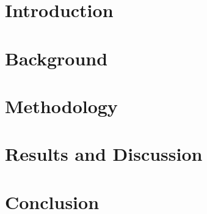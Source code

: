\documentclass[a4paper,12pt,twoside,openright]{book}
\begin{document}
\raggedbottom

\chapter{Introduction}
\label{ch:introduction}

\clearpage

\chapter{Background}
\label{ch:background}

\clearpage

\chapter{Methodology}
\label{ch:methodology}

\clearpage

\chapter{Results and Discussion}
\label{ch:results_and_discussion}

\clearpage

\chapter{Conclusion}
\label{ch:conclusion}

\clearpage

\nocite{*}



 

\begin{appendices}
	\label{ch:appendices}
	
\end{appendices}
\end{document}
